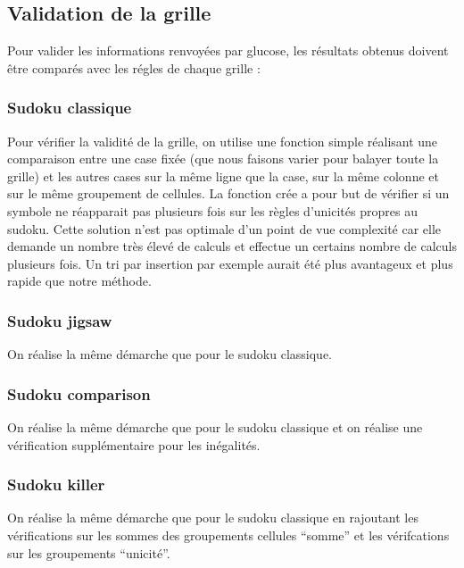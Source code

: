 \documentclass[a4paper,8pt,french,fleqn]{article}
\begin{document}
\subsection{Validation de la grille}

Pour valider les informations renvoyées par glucose, les résultats obtenus doivent être comparés avec les régles de chaque grille : \\

\subsubsection*{Sudoku classique}

Pour vérifier la validité de la grille, on utilise une fonction simple réalisant une comparaison entre une case fixée (que nous faisons varier pour balayer toute la grille) et les autres cases sur la même ligne que la case, sur la même colonne et sur le même groupement de cellules. La fonction crée a pour but de vérifier si un symbole ne réapparait pas plusieurs fois sur les règles d'unicités propres au sudoku. Cette solution n'est pas optimale d'un point de vue complexité car elle demande un nombre très élevé de calculs et effectue un certains nombre de calculs plusieurs fois. Un tri par insertion par exemple aurait été plus avantageux et plus rapide que notre méthode.   

\subsubsection*{Sudoku jigsaw}

On réalise la même démarche que pour le sudoku classique.

\subsubsection*{Sudoku comparison}

On réalise la même démarche que pour le sudoku classique et on réalise une vérification supplémentaire pour les inégalités.

\subsubsection*{Sudoku killer}

On réalise la même démarche que pour le sudoku classique en rajoutant les vérifications sur les sommes des groupements cellules ``somme'' et les vérifcations sur les groupements ``unicité''.
\end{document}
